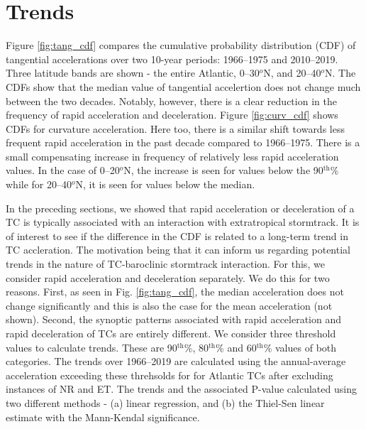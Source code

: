\documentclass[wcd,manuscript]{copernicus}
\begin{document}
\section{Trends}

Figure \ref{fig:tang_cdf} compares the cumulative probability distribution (CDF) of tangential accelerations over two 10-year periods: 1966--1975 and 2010--2019. Three latitude bands are shown - the entire Atlantic,  0--30$^o$N, and 20--40$^o$N. The CDFs show that the median value of tangential accelertion does not change much between the two decades. Notably, however, there is a clear reduction in the frequency of rapid acceleration and deceleration. Figure \ref{fig:curv_cdf} shows CDFs for curvature acceleration. Here too, there is a similar shift towards less frequent rapid acceleration in the past decade compared to 1966--1975. There is a small compensating increase in frequency of relatively less rapid acceleration values. In the case of  0--20$^o$N, the increase is seen for values below the 90$^\text{th}$\% while for 20--40$^o$N, it is seen for values below the median.

In the preceding sections, we showed that rapid acceleration or deceleration of a TC is typically associated with an interaction with extratropical stormtrack. It is of interest to see if the difference in the CDF is related to a long-term trend in TC accleration. The motivation being that it can inform us regarding potential trends in the nature of TC-baroclinic stormtrack interaction. For this, we consider rapid acceleration and deceleration separately. We do this for two reasons. First, as seen in Fig.  \ref{fig:tang_cdf}, the median acceleration does not change significantly and this is also the case for the mean acceleration (not shown). Second, the synoptic patterns associated with rapid acceleration and rapid deceleration of TCs are entirely different. We consider three threshold values to calculate trends. These are 90$^\text{th}$\%, 80$^\text{th}$\% and 60$^\text{th}$\% values of both categories. The trends over 1966--2019 are calculated using the annual-average acceleration exceeding these threhsolds for for Atlantic TCs after excluding instances of NR and ET. The trends and the associated P-value calculated using two different methods - (a) linear regression, and (b) the Thiel-Sen linear estimate with the Mann-Kendal significance.
\end{document}
